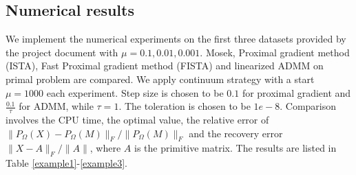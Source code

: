 \documentclass{article}
\begin{document}
\subsection{Numerical results}
We implement the numerical experiments on the first three datasets provided by the project document with $\mu=0.1,0.01,0.001$. Mosek, Proximal gradient method (ISTA), Fast Proximal gradient method (FISTA) and linearized ADMM on primal problem are compared. We apply continuum strategy with a start $\mu=1000$ each experiment. Step size is chosen to be $0.1$ for proximal gradient and $\frac{0.1}{\tau}$ for ADMM, while $\tau = 1$. The toleration is chosen to be $1e-8$. Comparison involves the CPU time, the optimal value, the relative error of $\|P_\Omega(X)-P_\Omega(M)\|_F/\|P_\Omega(M)\|_F$ and the recovery error $\|X-A\|_F/\|A\|$, where $A$ is the primitive matrix. The results are listed in Table \ref{example1}-\ref{example3}.
\end{document}
